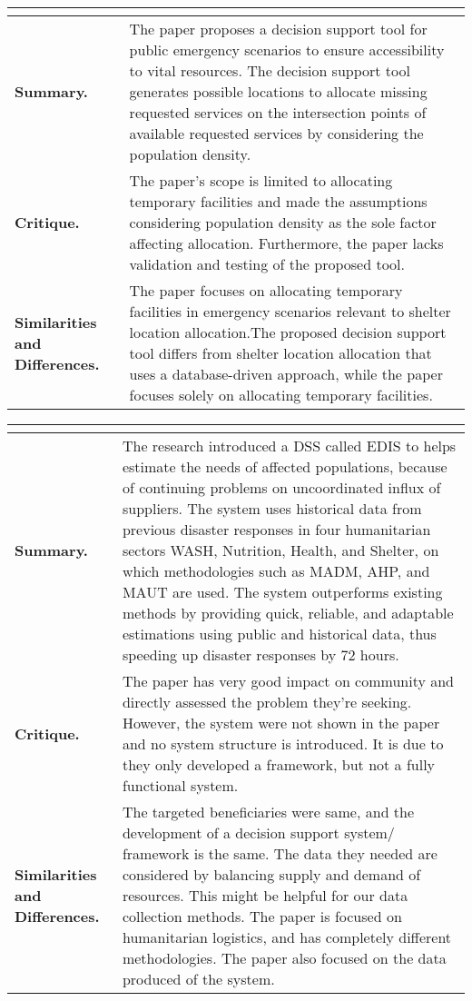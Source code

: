 \begin{longtable}{|L{.2\linewidth}|L{.74\linewidth}|}
	\hline
	\\ \hline
	\textbf{Summary.} & The paper proposes a decision support tool for public emergency scenarios to ensure accessibility to vital resources. The decision support tool generates possible locations to allocate missing requested services on the intersection points of available requested services by considering the population density.\\ \hline
	\textbf{Critique.} & The paper’s scope is limited to allocating temporary facilities and made the assumptions considering population density as the sole factor affecting allocation. Furthermore, the paper lacks validation and testing of the proposed tool.\\ \hline
	\textbf{Similarities and Differences.} & The paper focuses on allocating temporary facilities in emergency scenarios relevant to shelter location allocation.The proposed decision support tool differs from shelter location allocation that uses a database-driven approach, while the paper focuses solely on allocating temporary facilities. \\ \hline
\end{longtable}

\begin{longtable}{|L{.2\linewidth}|L{.74\linewidth}|}
	\hline
	\\ \hline
	\textbf{Summary.} & The research introduced a DSS called EDIS to helps estimate the needs of affected populations, because of continuing problems on uncoordinated influx of suppliers. The system uses historical data from previous disaster responses in four humanitarian sectors WASH, Nutrition, Health, and Shelter, on which methodologies such as MADM, AHP, and MAUT are used. The system outperforms existing methods by providing quick, reliable, and adaptable estimations using public and historical data, thus speeding up disaster responses by 72 hours.\\ \hline
	\textbf{Critique.} & The paper has very good impact on community and directly assessed the problem they're seeking. However, the system were not shown in the paper and no system structure is introduced. It is due to they only developed a framework, but not a fully functional system.\\ \hline
	\textbf{Similarities and Differences.} & The targeted beneficiaries were same, and the development of a decision support system/ framework  is the same. The data they needed are considered by balancing supply and demand of resources. This might be helpful for our data collection methods. The paper is focused on humanitarian logistics, and has completely different methodologies. The paper also focused on the data produced of the system. \\ \hline
\end{longtable}

